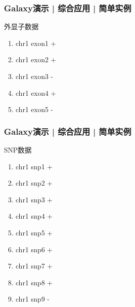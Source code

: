 \begin{frame}
  \frametitle{Galaxy演示 | 综合应用 | 简单实例}
  \begin{block}{外显子数据}
    \begin{enumerate}
      \item chr1   \qquad exon1  \qquad +
      \item chr1   \qquad exon2  \qquad +
      \item chr1   \qquad exon3  \qquad -
      \item chr1   \qquad exon4  \qquad +
      \item chr1   \qquad exon5  \qquad -
    \end{enumerate}
  \end{block}
\end{frame}

\begin{frame}
  \frametitle{Galaxy演示 | 综合应用 | 简单实例}
  \begin{block}{SNP数据}
    \begin{enumerate}
      \item chr1   \qquad snp1  \qquad +
      \item chr1   \qquad snp2  \qquad +
      \item chr1   \qquad snp3  \qquad +
      \item chr1   \qquad snp4  \qquad +
      \item chr1   \qquad snp5  \qquad +
      \item chr1   \qquad snp6  \qquad +
      \item chr1   \qquad snp7  \qquad +
      \item chr1   \qquad snp8  \qquad +
      \item chr1   \qquad snp9  \qquad -
    \end{enumerate}
  \end{block}
\end{frame}

